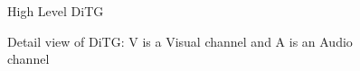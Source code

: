 \documentclass[letterpaper]{article}
\begin{document}

\begin{figure}[hbt]
\center
\setlength{\abovecaptionskip}{1mm}
\setlength{\belowcaptionskip}{1mm}
\setlength{\textfloatsep}{1mm}
\setlength{\floatsep}{1mm}
\caption{High Level DiTG}
\label{fig:ditg}
\end{figure}

\begin{figure}[hbt]
\center
\setlength{\abovecaptionskip}{1mm}
\setlength{\belowcaptionskip}{1mm}
\setlength{\textfloatsep}{1mm}
\setlength{\floatsep}{1mm}
\caption{Detail view of DiTG: V is a Visual channel and A is an Audio channel}
\label{fig:ditg_detail}
\end{figure}


%
%
\end{document}
